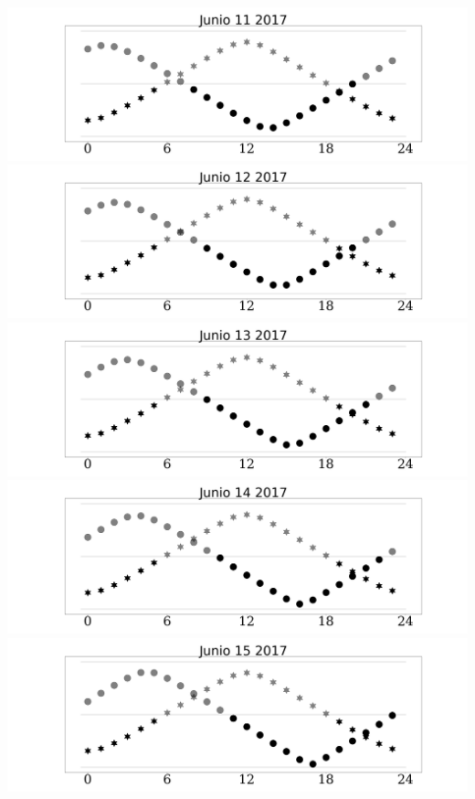 \documentclass{report}
\begin{document}
\includegraphics[width=1.00\textwidth]{Junio_11_2017.png}\newpage
\includegraphics[width=1.00\textwidth]{Junio_12_2017.png}\newpage
\includegraphics[width=1.00\textwidth]{Junio_13_2017.png}\newpage
\includegraphics[width=1.00\textwidth]{Junio_14_2017.png}\newpage
\includegraphics[width=1.00\textwidth]{Junio_15_2017.png}\newpage
\end{document}

